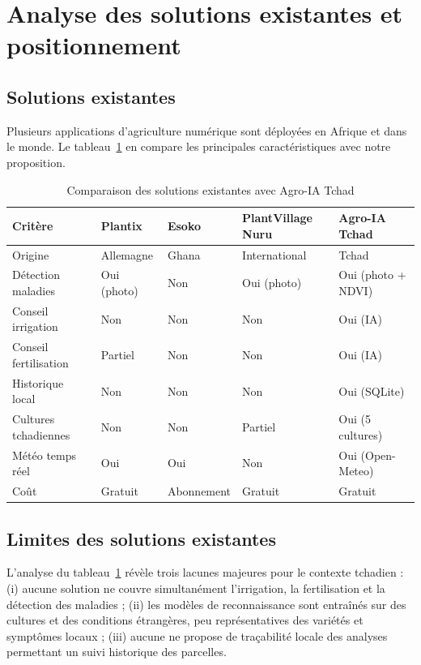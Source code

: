 \section{Analyse des solutions existantes et positionnement}
\label{sec:solutions_existantes}

\subsection{Solutions existantes}

Plusieurs applications d'agriculture numérique sont déployées en
Afrique et dans le monde. Le tableau~\ref{tab:solutions} en
compare les principales caractéristiques avec notre proposition.

\begin{table}[H]
	\centering
	\caption{Comparaison des solutions existantes avec Agro-IA Tchad}
	\label{tab:solutions}
	\small
	\begin{tabularx}{\textwidth}{lXXXX}
		\toprule
		\textbf{Critère} & \textbf{Plantix} & \textbf{Esoko} &
		\textbf{PlantVillage Nuru} & \textbf{Agro-IA Tchad} \\
		\midrule
		Origine & Allemagne & Ghana & International & Tchad \\
		Détection maladies & Oui (photo) & Non & Oui (photo) &
		Oui (photo + NDVI) \\
		Conseil irrigation & Non & Non & Non & Oui (IA) \\
		Conseil fertilisation & Partiel & Non & Non & Oui (IA) \\
		Historique local & Non & Non & Non & Oui (SQLite) \\
		Cultures tchadiennes & Non & Non & Partiel & Oui (5 cultures) \\
		Météo temps réel & Oui & Oui & Non & Oui (Open-Meteo) \\
		Coût & Gratuit & Abonnement & Gratuit & Gratuit \\
		\bottomrule
	\end{tabularx}
\end{table}

\subsection{Limites des solutions existantes}

L'analyse du tableau~\ref{tab:solutions} révèle trois lacunes
majeures pour le contexte tchadien : (i) aucune solution ne
couvre simultanément l'irrigation, la fertilisation et la
détection des maladies ; (ii) les modèles de reconnaissance sont
entraînés sur des cultures et des conditions étrangères, peu
représentatives des variétés et symptômes locaux ; (iii) aucune
ne propose de traçabilité locale des analyses permettant un
suivi historique des parcelles.


